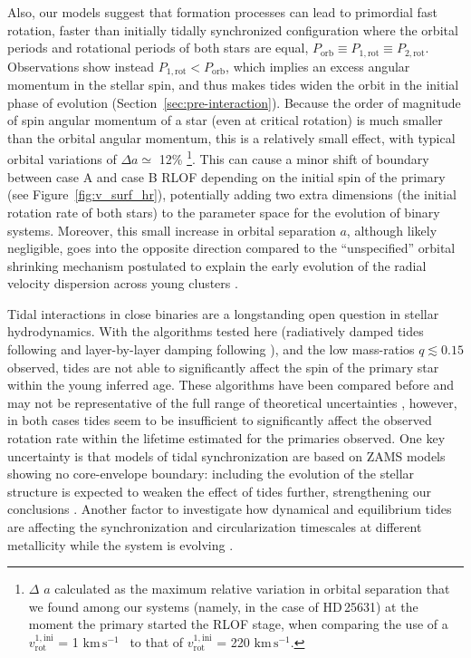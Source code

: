 \documentclass{aa}
\newcommand{\kms}{$\mathrm{km\,s^{-1}}$}
\DeclareRobustCommand{\Figref}[1]{Figure~\ref{#1}}
\DeclareRobustCommand{\Secref}[1]{Section~\ref{#1}}
\begin{document}
Also, our models suggest that formation processes can lead to primordial
  fast rotation, faster than initially tidally synchronized
  configuration where the orbital periods and rotational periods of
  both stars are equal,
  $P_\mathrm{orb}\equiv P_\mathrm{1, rot} \equiv P_\mathrm{2, rot}$.
  Observations show instead $P_\mathrm{1, rot}<P_\mathrm{orb}$, which
  implies an excess angular momentum in the stellar spin, and thus
  makes tides widen the orbit in the initial phase of evolution
  (\Secref{sec:pre-interaction}). Because the order of magnitude of spin angular momentum of a star
  (even at critical rotation) is much smaller than the orbital angular
  momentum, this is a relatively small effect, with typical orbital
  variations of $\Delta a\simeq$ 12\% \footnote{$\Delta$ $a$ calculated as the maximum relative variation in orbital separation that we found among our systems (namely, in the case of HD\,25631) at the moment the primary started the RLOF stage, when comparing the use of a $v_\mathrm{rot}^\mathrm{1,ini}$ = 1 \kms~ to that of $v_\mathrm{rot}^\mathrm{1,ini}$ = 220 \kms.}. This
  can cause a minor shift of boundary between case A and case B RLOF
  depending on the initial spin of the primary (see
  \Figref{fig:v_surf_hr}), potentially adding two extra dimensions
  (the initial rotation rate of both stars) to the parameter space for
  the evolution of binary systems.
  Moreover, this small increase in orbital separation $a$, although
  likely negligible, goes into the opposite direction compared to the
  ``unspecified'' orbital shrinking mechanism postulated to explain
  the early evolution of the radial velocity dispersion across young clusters
  \citep[e.g.,][]{sana:17, ramirez-tannus:21}.

  Tidal interactions in close binaries are a longstanding open
  question in stellar hydrodynamics. With the algorithms tested here
  (radiatively damped tides following \cite{Hut_1980} and
  layer-by-layer damping following \cite{Qin_2018}), and the low
  mass-ratios $q\lesssim0.15$ observed, tides are not able to
  significantly affect the spin of the primary star within the young
  inferred age. These algorithms have been compared before
  \citep[e.g.,][]{Qin_2018} and may not be representative of the full
  range of theoretical uncertainties \citep[e.g.,][]{Ma_2023, Sciarini_2024},
  however, in both cases tides seem to be insufficient to
  significantly affect the observed rotation rate within the lifetime
  estimated for the primaries observed. One key uncertainty is that
  models of tidal synchronization are based on ZAMS models showing no
  core-envelope boundary: including the evolution of the stellar
  structure is expected to weaken the effect of tides further,
  strengthening our conclusions \citep{Mirouh_2023}.
  Another factor to investigate how dynamical and equilibrium tides are affecting the synchronization and circularization timescales at different metallicity while the system is evolving  \citep[see,][]{Siess_2013}.
\end{document}
